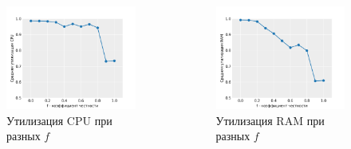 \documentclass[t]{beamer}  %
\begin{document}
\begin{frame}[fragile]
	\frametitle{\insertsection} 
	\framesubtitle{\insertsubsection}

	\vspace{-0.5cm}
	
	\begin{columns}
		\begin{column}{0.6\linewidth}
			\begin{figure}[H]
				\centering 
					\includegraphics[width=\linewidth]{images/cpu_utilization}
					\caption*{Утилизация CPU при разных $f$}
				\end{figure}
		\end{column}
		\hspace{-0.5cm}
		\begin{column}{0.6\linewidth}
			\begin{figure}[H]
				\centering 
					\includegraphics[width=\linewidth]{images/memory_utilization}
					\caption*{Утилизация RAM при разных $f$}
				\end{figure}
		\end{column}
	\end{columns}

	
\end{frame}
\end{document}
